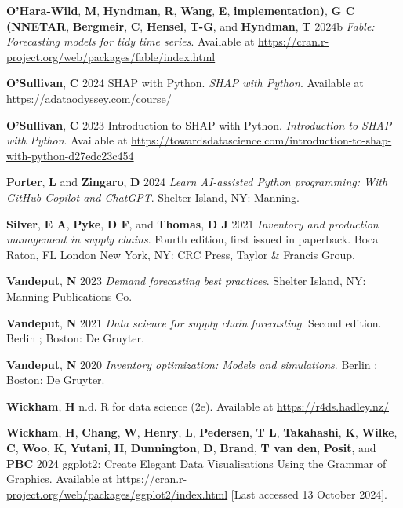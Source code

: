 \documentclass[
  american,
  10,
  a4paper,
]{book}
\newlength{\cslhangindent}
\newenvironment{CSLReferences}[2] %
 {\begin{list}{}{%
  \setlength{\itemindent}{0pt}
  \setlength{\leftmargin}{0pt}
  \setlength{\parsep}{0pt}
  \ifodd #1
   \setlength{\leftmargin}{\cslhangindent}
   \setlength{\itemindent}{-1\cslhangindent}
  \fi
  \setlength{\itemsep}{#2\baselineskip}}}
 {\end{list}}
\theoremstyle{definition}
\theoremstyle{remark}
\begin{document}
\begin{CSLReferences}{0}{0}
\textbf{O'Hara-Wild}, \textbf{M}, \textbf{Hyndman}, \textbf{R},
\textbf{Wang}, \textbf{E}, \textbf{implementation)}, \textbf{G C
(NNETAR}, \textbf{Bergmeir}, \textbf{C}, \textbf{Hensel}, \textbf{T-G},
and \textbf{Hyndman}, \textbf{T} 2024b \emph{Fable: Forecasting models
for tidy time series}. Available at
\url{https://cran.r-project.org/web/packages/fable/index.html}

\textbf{O'Sullivan}, \textbf{C} 2024 {SHAP} with {Python}. \emph{SHAP
with Python}. Available at \url{https://adataodyssey.com/course/}

\textbf{O'Sullivan}, \textbf{C} 2023 Introduction to {SHAP} with
{Python}. \emph{Introduction to SHAP with Python}. Available at
\url{https://towardsdatascience.com/introduction-to-shap-with-python-d27edc23c454}

\textbf{Porter}, \textbf{L} and \textbf{Zingaro}, \textbf{D} 2024
\emph{Learn {AI}-assisted {Python} programming: With {GitHub} {Copilot}
and {ChatGPT}}. Shelter Island, NY: Manning.

\textbf{Silver}, \textbf{E A}, \textbf{Pyke}, \textbf{D F}, and
\textbf{Thomas}, \textbf{D J} 2021 \emph{Inventory and production
management in supply chains}. Fourth edition, first issued in paperback.
Boca Raton, FL London New York, NY: CRC Press, Taylor \& Francis Group.

\textbf{Vandeput}, \textbf{N} 2023 \emph{Demand forecasting best
practices}. Shelter Island, NY: Manning Publications Co.

\textbf{Vandeput}, \textbf{N} 2021 \emph{Data science for supply chain
forecasting}. Second edition. Berlin ; Boston: De Gruyter.

\textbf{Vandeput}, \textbf{N} 2020 \emph{Inventory optimization: Models
and simulations}. Berlin ; Boston: De Gruyter.

\textbf{Wickham}, \textbf{H} n.d. R for data science (2e). Available at
\url{https://r4ds.hadley.nz/}

\textbf{Wickham}, \textbf{H}, \textbf{Chang}, \textbf{W},
\textbf{Henry}, \textbf{L}, \textbf{Pedersen}, \textbf{T L},
\textbf{Takahashi}, \textbf{K}, \textbf{Wilke}, \textbf{C},
\textbf{Woo}, \textbf{K}, \textbf{Yutani}, \textbf{H},
\textbf{Dunnington}, \textbf{D}, \textbf{Brand}, \textbf{T van den},
\textbf{Posit}, and \textbf{PBC} 2024 ggplot2: {Create} {Elegant} {Data}
{Visualisations} {Using} the {Grammar} of {Graphics}. Available at
\url{https://cran.r-project.org/web/packages/ggplot2/index.html} {[}Last
accessed 13 October 2024{]}.

\end{CSLReferences}
\end{document}
